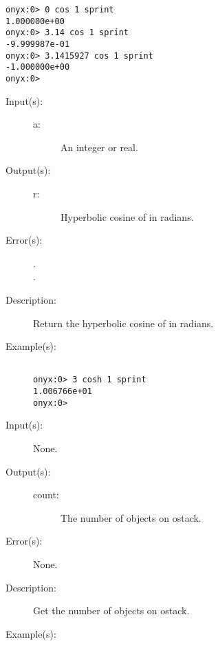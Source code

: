 \begin{description}
\begin{description}
\begin{verbatim}
onyx:0> 0 cos 1 sprint
1.000000e+00
onyx:0> 3.14 cos 1 sprint
-9.999987e-01
onyx:0> 3.1415927 cos 1 sprint
-1.000000e+00
onyx:0>
		\end{verbatim}
	\end{description}
\label{systemdict:cosh}
\item[{\onyxop{a}{cosh}{r}}: ]
	\begin{description}\item[]
	\item[Input(s): ]
		\begin{description}\item[]
		\item[a: ]
			An integer or real.
		\end{description}
	\item[Output(s): ]
		\begin{description}\item[]
		\item[r: ]
			Hyperbolic cosine of  in radians.
		\end{description}
	\item[Error(s): ]
		\begin{description}\item[]
		\item[.]
		\item[.]
		\end{description}
	\item[Description: ]
		Return the hyperbolic cosine of  in radians.
	\item[Example(s): ]\begin{verbatim}

onyx:0> 3 cosh 1 sprint
1.006766e+01
onyx:0>
		\end{verbatim}
	\end{description}
\label{systemdict:count}
\item[{\onyxop{--}{count}{count}}: ]
	\begin{description}\item[]
	\item[Input(s): ] None.
	\item[Output(s): ]
		\begin{description}\item[]
		\item[count: ]
			The number of objects on ostack.
		\end{description}
	\item[Error(s): ] None.
	\item[Description: ]
		Get the number of objects on ostack.
	\item[Example(s): ]\begin{verbatim}


\end{verbatim}
\end{description}
\end{description}
